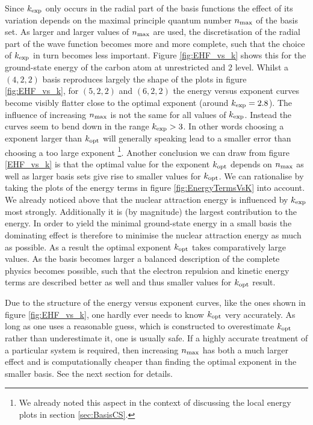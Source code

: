 Since $k_\text{exp}$ only occurs in the radial part of the \CS basis functions
the effect of its variation depends on the
maximal principle quantum number $n_\text{max}$ of the basis set.
As larger and larger values of $n_\text{max}$ are used,
the discretisation of the radial part of the wave function
becomes more and more complete,
such that the choice of $k_\text{exp}$ in turn becomes less important.
Figure \vref{fig:EHF_vs_k} shows this for the ground-state energy of the carbon atom
at unrestricted \HF and {\MP}2 level.
Whilst a $(4,2,2)$ \CS basis reproduces largely the
shape of the plots in figure \ref{fig:EHF_vs_k},
for $(5,2,2)$ and $(6,2,2)$ the energy versus exponent curves
become visibly flatter close to the optimal exponent (around $k_\text{exp} = 2.8$).
The influence of increasing $n_\text{max}$ is not the same
for all values of $k_\text{exp}$.
Instead the curves seem to bend down in the range $k_\text{exp} > 3$.
In other words choosing a \CS exponent larger than $k_\text{opt}$
will generally speaking lead to a smaller error
than choosing a too large exponent%
\footnote{We already noted this aspect in the context of discussing
	the local energy plots in section \vref{sec:BasisCS}.}.
Another conclusion we can draw from figure \ref{EHF_vs_k}
is that the optimal value for the exponent $k_\text{opt}$
depends on $n_\text{max}$ as well
as larger basis sets give rise to smaller values for $k_\text{opt}$.
We can rationalise by taking the plots of the energy terms
in figure \vref{fig:EnergyTermsVsK} into account.
We already noticed above that the nuclear attraction energy
is influenced by $k_\text{exp}$ most strongly.
Additionally it is (by magnitude) the largest contribution to the \HF energy.
In order to yield the minimal ground-state energy
in a small basis the dominating effect is therefore to
minimise the nuclear attraction energy as much as possible.
As a result the optimal exponent $k_\text{opt}$ takes comparatively large values.
As the basis becomes larger a balanced description
of the complete physics becomes possible,
such that the electron repulsion and kinetic energy terms
are described better as well
and thus smaller values for $k_\text{opt}$ result.

Due to the structure of the energy versus exponent curves,
like the ones shown in figure \vref{fig:EHF_vs_k},
one hardly ever needs to know $k_\text{opt}$ very accurately.
As long as one uses a reasonable guess,
which is constructed to overestimate $k_\text{opt}$
rather than underestimate it, one is usually safe.
If a highly accurate treatment of a particular system is required,
then increasing $n_\text{max}$ has both a much larger effect
and is computationally cheaper than finding the optimal exponent in the smaller basis.
See the next section for details.

